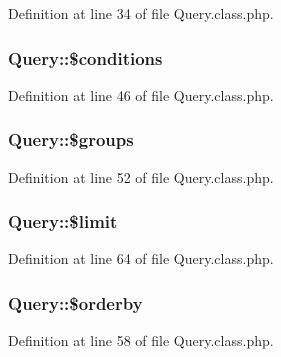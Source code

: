 Definition at line 34 of file Query.\+class.\+php.

\subsubsection[{\texorpdfstring{\$conditions}{$conditions}}]{\setlength{\rightskip}{0pt plus 5cm}Query\+::\$conditions}\hypertarget{classQuery_a5c71d786a82b2cc014968d2553b6bc9d}{}\label{classQuery_a5c71d786a82b2cc014968d2553b6bc9d}


Definition at line 46 of file Query.\+class.\+php.

\subsubsection[{\texorpdfstring{\$groups}{$groups}}]{\setlength{\rightskip}{0pt plus 5cm}Query\+::\$groups}\hypertarget{classQuery_a76992fbfae6d700e65dfde28911a2475}{}\label{classQuery_a76992fbfae6d700e65dfde28911a2475}


Definition at line 52 of file Query.\+class.\+php.

\subsubsection[{\texorpdfstring{\$limit}{$limit}}]{\setlength{\rightskip}{0pt plus 5cm}Query\+::\$limit}\hypertarget{classQuery_abe481cf8b7f42b513a4f64cf7fb0ffea}{}\label{classQuery_abe481cf8b7f42b513a4f64cf7fb0ffea}


Definition at line 64 of file Query.\+class.\+php.

\subsubsection[{\texorpdfstring{\$orderby}{$orderby}}]{\setlength{\rightskip}{0pt plus 5cm}Query\+::\$orderby}\hypertarget{classQuery_aa955216a83dfe57cdd9600b44b38ebac}{}\label{classQuery_aa955216a83dfe57cdd9600b44b38ebac}


Definition at line 58 of file Query.\+class.\+php.

